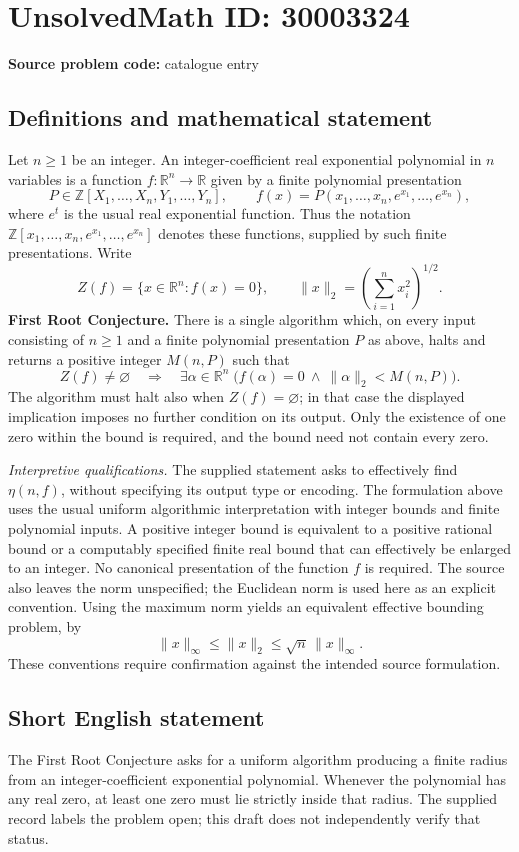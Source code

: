 \documentclass[11pt]{article}
\newcommand{\Z}{\mathbb{Z}}
\newcommand{\R}{\mathbb{R}}
\begin{document}
\section*{UnsolvedMath ID: 30003324}
\textbf{Source problem code:} catalogue entry
\subsection{Definitions and mathematical statement}
Let \(n\geq 1\) be an integer. An integer-coefficient real exponential polynomial in \(n\) variables is a function \(f:\R^n\to\R\) given by a finite polynomial presentation
\[
P\in\Z[X_1,\ldots,X_n,Y_1,\ldots,Y_n],\qquad
f(x)=P(x_1,\ldots,x_n,e^{x_1},\ldots,e^{x_n}),
\]
where \(e^t\) is the usual real exponential function. Thus the notation \(\Z[x_1,\ldots,x_n,e^{x_1},\ldots,e^{x_n}]\) denotes these functions, supplied by such finite presentations. Write
\[
Z(f)=\{x\in\R^n:f(x)=0\},\qquad
\|x\|_2=\left(\sum_{i=1}^n x_i^2\right)^{1/2}.
\]
\textbf{First Root Conjecture.} There is a single algorithm which, on every input consisting of \(n\geq1\) and a finite polynomial presentation \(P\) as above, halts and returns a positive integer \(M(n,P)\) such that
\[
Z(f)\neq\varnothing
\quad\Longrightarrow\quad
\exists\alpha\in\R^n\;
\bigl(f(\alpha)=0\ \land\ \|\alpha\|_2<M(n,P)\bigr).
\]
The algorithm must halt also when \(Z(f)=\varnothing\); in that case the displayed implication imposes no further condition on its output. Only the existence of one zero within the bound is required, and the bound need not contain every zero.

\textit{Interpretive qualifications.} The supplied statement asks to effectively find \(\eta(n,f)\), without specifying its output type or encoding. The formulation above uses the usual uniform algorithmic interpretation with integer bounds and finite polynomial inputs. A positive integer bound is equivalent to a positive rational bound or a computably specified finite real bound that can effectively be enlarged to an integer. No canonical presentation of the function \(f\) is required. The source also leaves the norm unspecified; the Euclidean norm is used here as an explicit convention. Using the maximum norm yields an equivalent effective bounding problem, by
\[
\|x\|_\infty\leq\|x\|_2\leq\sqrt n\,\|x\|_\infty.
\]
These conventions require confirmation against the intended source formulation.
\subsection{Short English statement}
The First Root Conjecture asks for a uniform algorithm producing a finite radius from an integer-coefficient exponential polynomial. Whenever the polynomial has any real zero, at least one zero must lie strictly inside that radius. The supplied record labels the problem open; this draft does not independently verify that status.
\end{document}
